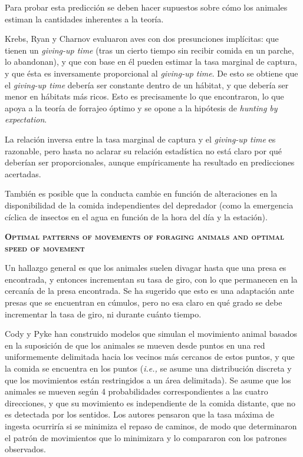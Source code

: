\documentclass[a4paper,12pt]{article}
\begin{document}
Para probar esta predicción se deben hacer supuestos sobre cómo los animales estiman la cantidades inherentes a la teoría.

Krebs, Ryan y Charnov evaluaron aves con dos presunciones implícitas: que tienen un {\itshape giving-up time} (tras un cierto tiempo sin recibir comida en un parche, lo abandonan), y que con base en él pueden estimar la tasa marginal de captura, y que ésta es inversamente proporcional al {\itshape giving-up time}. De esto se obtiene que el {\itshape giving-up time} debería ser constante dentro de un hábitat, y que debería ser menor en hábitats más ricos. Esto es precisamente lo que encontraron, lo que apoya a la teoría de forrajeo óptimo y se opone a la hipótesis de {\itshape hunting by expectation}.

La relación inversa entre la tasa marginal de captura y el {\itshape giving-up time} es razonable, pero hasta no aclarar su relación estadística no está claro por qué deberían ser proporcionales, aunque empíricamente ha resultado en predicciones acertadas.

También es posible que la conducta cambie en función de alteraciones en la disponibilidad de la comida independientes del depredador (como la emergencia cíclica de insectos en el agua en función de la hora del día y la estación).

{\scshape\bfseries Optimal patterns of movements of foraging animals and optimal speed of movement}

Un hallazgo general es que los animales suelen divagar hasta que una presa es encontrada, y entonces incrementan su tasa de giro, con lo que permanecen en la cercanía de la presa encontrada. Se ha sugerido que esto es una adaptación ante presas que se encuentran en cúmulos, pero no esa claro en qué grado se debe incrementar la tasa de giro, ni durante cuánto tiempo.

Cody y Pyke han construido modelos que simulan el movimiento animal basados en la suposición de que los animales se mueven desde puntos en una red uniformemente delimitada hacia los vecinos más cercanos de estos puntos, y que la comida se encuentra en los puntos ({\itshape i.e.,} se asume una distribución discreta y que los movimientos están restringidos a un área delimitada). Se asume que los animales se mueven según 4 probabilidades correspondientes a las cuatro direcciones, y que su movimiento es independiente de la comida distante, que no es detectada por los sentidos. Los autores pensaron que la tasa máxima de ingesta ocurriría si se minimiza el repaso de caminos, de modo que determinaron el patrón de movimientos que lo minimizara y lo compararon con los patrones observados. 
\end{document}
